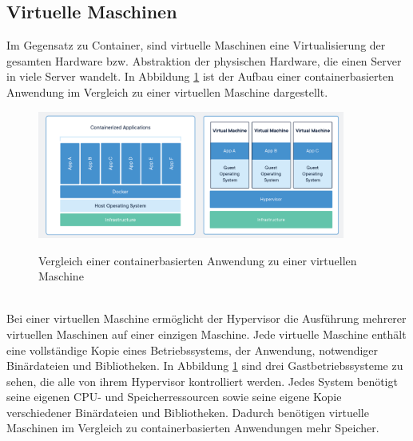 \subsection{Virtuelle Maschinen}
Im Gegensatz zu Container, sind virtuelle Maschinen eine Virtualisierung der gesamten Hardware bzw. Abstraktion der physischen Hardware, die einen Server in viele Server wandelt. In Abbildung \ref{vm} ist der Aufbau einer containerbasierten Anwendung im Vergleich zu einer virtuellen Maschine dargestellt.
\begin{figure}[bth] 
	\centering
	\includegraphics[width=0.9\textwidth]{Graphics/containerVsVm.png}
	\caption{Vergleich einer containerbasierten Anwendung zu einer virtuellen Maschine}
	\label{vm}
	\cite{container}
\end{figure}\\
Bei einer virtuellen Maschine ermöglicht der Hypervisor die Ausführung mehrerer virtuellen Maschinen auf einer einzigen Maschine. Jede virtuelle Maschine enthält eine vollständige Kopie eines Betriebssystems, der Anwendung, notwendiger Binärdateien und Bibliotheken. In Abbildung \ref{vm} sind drei Gastbetriebssysteme zu sehen, die alle von ihrem Hypervisor kontrolliert werden. Jedes System benötigt seine eigenen CPU- und Speicherressourcen sowie seine eigene Kopie verschiedener Binärdateien und Bibliotheken. Dadurch benötigen virtuelle Maschinen im Vergleich zu containerbasierten Anwendungen mehr Speicher.

